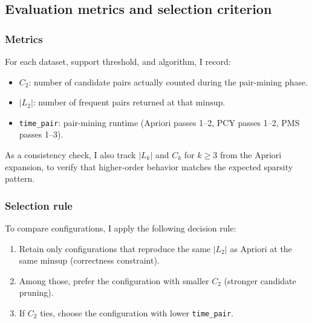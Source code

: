 \documentclass{article}  %
\begin{document}
\subsection*{Evaluation metrics and selection criterion}

\subsubsection{Metrics}
For each dataset, support threshold, and algorithm, I record:
\begin{itemize}
    \item \(C_{2}\): number of candidate pairs actually counted during the
    pair-mining phase.
    \item \(|L_{2}|\): number of frequent pairs returned at that
    \(\mathrm{minsup}\).
    \item \verb|time_pair|: pair-mining runtime (Apriori passes 1--2,
    PCY passes 1--2, PMS passes 1--3).
\end{itemize}
As a consistency check, I also track \(|L_{k}|\) and \(C_{k}\) for \(k \ge 3\) from the Apriori expansion, to verify that higher-order behavior matches the expected sparsity pattern. 

\subsubsection{Selection rule}

To compare configurations, I apply the following
decision rule:
\begin{enumerate}
    \item Retain only configurations that reproduce the same \(|L_{2}|\) as   Apriori at the same \(\mathrm{minsup}\) (correctness constraint).
    \item Among those, prefer the configuration with smaller \(C_{2}\)   (stronger candidate pruning).
    \item If \(C_{2}\) ties, choose the configuration with lower \verb|time_pair|.

\end{enumerate}
\end{document}
